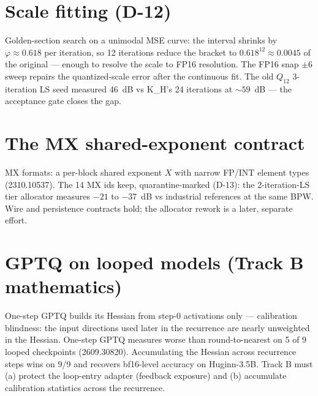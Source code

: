 \section{Scale fitting (D-12)}

Golden-section search on a unimodal MSE curve: the interval shrinks by $\varphi \approx 0.618$
per iteration, so 12 iterations reduce the bracket to $0.618^{12} \approx 0.0045$ of the
original --- enough to resolve the scale to FP16 resolution. The FP16 snap $\pm6$ sweep
repairs the quantized-scale error after the continuous fit. The old $Q_{12}$ 3-iteration LS
seed measured 46~dB vs K\_H's 24 iterations at ${\sim}59$~dB --- the acceptance gate closes the
gap.

\section{The MX shared-exponent contract}

MX formats: a per-block shared exponent $X$ with narrow FP/INT element types (2310.10537). The
14 MX ids keep, quarantine-marked (D-13): the 2-iteration-LS tier allocator measures $-21$ to
$-37$~dB vs industrial references at the same BPW. Wire and persistence contracts hold; the
allocator rework is a later, separate effort.

\section{GPTQ on looped models (Track B mathematics)}

One-step GPTQ builds its Hessian from step-0 activations only --- calibration blindness: the
input directions used later in the recurrence are nearly unweighted in the Hessian. One-step
GPTQ measures worse than round-to-nearest on 5 of 9 looped checkpoints (2609.30820).
Accumulating the Hessian across recurrence steps wins on 9/9 and recovers bf16-level accuracy
on Huginn-3.5B. Track B must (a) protect the loop-entry adapter (feedback exposure) and
(b) accumulate calibration statistics across the recurrence.
